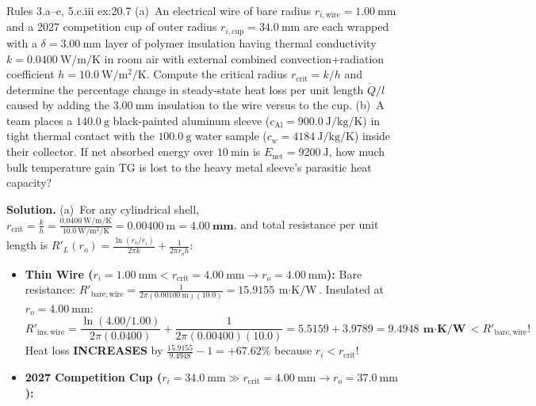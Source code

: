 \begin{workedexample}[Case Study 7 (\texttt{ERR-14}, \texttt{ERR-15}): Critical Radius Paradox ($r_{\mathrm{crit}} = k/h$) vs.\ 2027 Cup \& Parasitic Thermal Mass]{Rules 3.a--e, 5.c.iii }{ex:20.7}
(a)~An electrical wire of bare radius $r_{i,\mathrm{wire}} = \SI{1.00}{\milli\meter}$ and a 2027 competition cup of outer radius $r_{i,\mathrm{cup}} = \SI{34.0}{\milli\meter}$ are each wrapped with a $\delta = \SI{3.00}{\milli\meter}$ layer of polymer insulation having thermal conductivity $k = \SI{0.0400}{\watt\per\meter\per\kelvin}$ in room air with external combined convection+radiation coefficient $h = \SI{10.0}{\watt\per\square\meter\per\kelvin}$. Compute the critical radius $r_{\mathrm{crit}} = k/h$ and determine the percentage change in steady-state heat loss per unit length $\dot{Q}/l$ caused by adding the $\SI{3.00}{\milli\meter}$ insulation to the wire versus to the cup.
(b)~A team places a $\SI{140.0}{\gram}$ black-painted aluminum sleeve ($c_{\mathrm{Al}} = \SI{900.0}{\joule\per\kilogram\per\kelvin}$) in tight thermal contact with the $\SI{100.0}{\gram}$ water sample ($c_w = \SI{4184}{\joule\per\kilogram\per\kelvin}$) inside their collector. If net absorbed energy over $\SI{10}{\minute}$ is $E_{\mathrm{net}} = \SI{9200}{\joule}$, how much bulk temperature gain $\mathrm{TG}$ is lost to the heavy metal sleeve's parasitic heat capacity?
\par\smallskip\noindent
\textbf{Solution.}
(a)~For any cylindrical shell, $r_{\mathrm{crit}} = \frac{k}{h} = \frac{\SI{0.0400}{\watt\per\meter\per\kelvin}}{\SI{10.0}{\watt\per\square\meter\per\kelvin}} = \SI{0.00400}{\meter} = \mathbf{\SI{4.00}{\milli\meter}}$, and total resistance per unit length is $R'_L(r_o) = \frac{\ln(r_o/r_i)}{2\pi k} + \frac{1}{2\pi r_o h}$:
\begin{itemize}
  \item \textbf{Thin Wire ($r_i = \SI{1.00}{\milli\meter} < r_{\mathrm{crit}} = \SI{4.00}{\milli\meter} \to r_o = \SI{4.00}{\milli\meter}$):}
  Bare resistance: $R'_{\mathrm{bare,wire}} = \frac{1}{2\pi(\SI{0.00100}{\meter})(10.0)} = \SI{15.9155}{\meter\cdot\kelvin\per\watt}$. Insulated at $r_o = \SI{4.00}{\milli\meter}$:
  $$R'_{\mathrm{ins,wire}} = \frac{\ln(4.00/1.00)}{2\pi(0.0400)} + \frac{1}{2\pi(0.00400)(10.0)} = 5.5159 + 3.9789 = \mathbf{\SI{9.4948}{\meter\cdot\kelvin\per\watt}} < R'_{\mathrm{bare,wire}}\text{!}$$
  Heat loss \textbf{INCREASES} by $\frac{15.9155}{9.4948} - 1 = \mathbf{+67.62\%}$ because $r_i < r_{\mathrm{crit}}$!
  \item \textbf{2027 Competition Cup ($r_i = \SI{34.0}{\milli\meter} \gg r_{\mathrm{crit}} = \SI{4.00}{\milli\meter} \to r_o = \SI{37.0}{\milli\meter}$):}

\end{itemize}
\end{workedexample}
